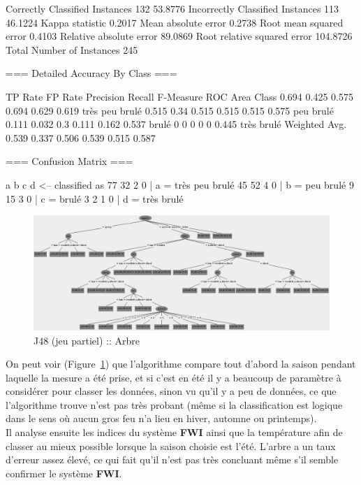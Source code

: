 \documentclass{article}
\begin{document}
\begin{sffamily}
\begin{center}
\begin{boxedverbatim}
Correctly Classified Instances         132               53.8776 %
Incorrectly Classified Instances       113               46.1224 %
Kappa statistic                          0.2017
Mean absolute error                      0.2738
Root mean squared error                  0.4103
Relative absolute error                 89.0869 %
Root relative squared error            104.8726 %
Total Number of Instances              245     

=== Detailed Accuracy By Class ===

               TP Rate   FP Rate   Precision   Recall  F-Measure   ROC Area  Class
                 0.694     0.425      0.575     0.694     0.629      0.619    très peu brulé
                 0.515     0.34       0.515     0.515     0.515      0.575    peu brulé
                 0.111     0.032      0.3       0.111     0.162      0.537    brulé
                 0         0          0         0         0          0.445    très brulé
Weighted Avg.    0.539     0.337      0.506     0.539     0.515      0.587

=== Confusion Matrix ===

  a  b  c  d   <-- classified as
 77 32  2  0 |  a = très peu brulé
 45 52  4  0 |  b = peu brulé
  9 15  3  0 |  c = brulé
  3  2  1  0 |  d = très brulé
	\end{boxedverbatim}
\end{center}

\begin{figure}[h!]
    \begin{center}
    \includegraphics[scale=0.35]{img_005b.pdf}
    \caption{J48 (jeu partiel) :: Arbre}
    \label{j48part}
    \end{center}	
\end{figure}

On peut voir (Figure~\ref{j48part}) que l'algorithme compare tout d'abord la saison pendant laquelle la mesure a été prise, et si
c'est en été il y a beaucoup de paramètre à considérer pour classer les données, sinon vu qu'il y a peu de données, ce que 
l'algorithme trouve n'est pas très probant (même si la classification est logique dans le sens où aucun gros feu n'a lieu en 
hiver, automne ou printemps).\\
Il analyse ensuite les indices du système \textbf{FWI} ainsi que la température afin de classer au mieux possible lorsque la 
saison choisie est l'été. L'arbre a un taux d'erreur assez élevé, ce qui fait qu'il n'est pas très concluant même s'il semble 
confirmer le système \textbf{FWI}.


\end{sffamily}
\end{document}
